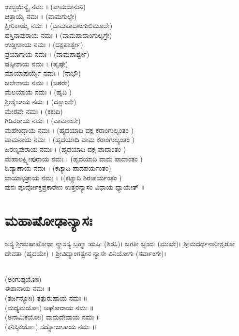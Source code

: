  ಉಜ್ಜಯಿನ್ಯೈ ನಮಃ । (ವಾಮಜಾನುನಿ)\\
 ಚಿತ್ರಾಯೈ ನಮಃ । (ವಾಮಗುಲ್ಫೇ)\\
 ಕ್ಷೀರಿಕಾಯೈ ನಮಃ । (ವಾಮಪಾದಾಂಗುಲಿಮೂಲೇ)\\
 ಹಸ್ತಿನಾಪುರಾಯ ನಮಃ । (ವಾಮಪಾದಾಂಗುಲ್ಯಗ್ರೇ)\\
 ಉಡ್ಡೀಶಾಯ ನಮಃ । (ದಕ್ಷಪಾರ್ಶ್ವೇ)\\
 ಪ್ರಯಾಗಾಯ ನಮಃ । (ವಾಮಪಾರ್ಶ್ವೇ)\\
 ಷಷ್ಠೀಶಾಯ ನಮಃ । (ಪೃಷ್ಠೇ)\\
 ಮಾಯಾಪುರ್ಯೈ ನಮಃ । (ನಾಭೌ)\\
 ಜಲೇಶಾಯ ನಮಃ । (ಜಠರೇ)\\
 ಮಲಯಾಯ ನಮಃ । (ಹೃದಿ )\\
 ಶ್ರೀಶೈಲಾಯ ನಮಃ । (ದಕ್ಷಾಂಸೇ)\\
 ಮೇರವೇ ನಮಃ । (ಕಕುದಿ)\\
 ಗಿರಿವರಾಯ ನಮಃ । (ವಾಮಾಂಸೇ)\\
 ಮಹೇಂದ್ರಾಯ ನಮಃ । (ಹೃದಯಾದಿ ದಕ್ಷ ಕರಾಂಗುಲ್ಯಂತಂ )\\
 ವಾಮನಾಯ ನಮಃ । (ಹೃದಯಾದಿ ವಾಮ ಕರಾಂಗುಲ್ಯಂತಂ )\\
 ಹಿರಣ್ಯಪುರಾಯ ನಮಃ । (ಹೃದಯಾದಿ ದಕ್ಷ ಪಾದಾಂತಂ )\\
 ಮಹಾಲಕ್ಷ್ಮೀಪುರಾಯ ನಮಃ । (ಹೃದಯಾದಿ ವಾಮ ಪಾದಾಂತಂ )\\
 ಓಡ್ಯಾಣಾಯ ನಮಃ । (ಕಟ್ಯಾದಿ ಪಾದಪರ್ಯಂತಂ)\\
 ಛಾಯಾಛತ್ರಾಯ ನಮಃ । ।(ಕಟ್ಯಾದಿ ಶಿರಃಪರ್ಯಂತಂ )\\
ಪುನಃ ಪೂರ್ವೋಕ್ತಪ್ರಕಾರೇಣ ಉತ್ತರನ್ಯಾಸಂ ವಿಧಾಯ ಧ್ಯಾಯೇತ್ ॥

\newpage
\section{ಮಹಾಷೋಢಾನ್ಯಾಸಃ}
ಅಸ್ಯ ಶ್ರೀಮಹಾಷೋಢಾ ನ್ಯಾಸಸ್ಯ ಬ್ರಹ್ಮಾ ಋಷಿಃ (ಶಿರಸಿ)। ಜಗತೀ ಚ್ಛಂದಃ (ಮುಖೇ)। ಶ್ರೀಮದರ್ಧನಾರೀಶ್ವರೋ ದೇವತಾ (ಹೃದಯೇ) । ಶ್ರೀವಿದ್ಯಾಂಗತ್ವೇನ ನ್ಯಾಸೇ ವಿನಿಯೋಗಃ (ಸರ್ವಾಂಗೇ)।

\\
(ಅಂಗುಷ್ಠಯೋಃ)\\ ಈಶಾನಾಯ ನಮಃ ॥\\
(ತರ್ಜನ್ಯೋಃ) ತತ್ಪುರುಷಾಯ ನಮಃ ॥\\
(ಮಧ್ಯಮಯೋಃ) ಅಘೋರಾಯ ನಮಃ ॥\\
(ಅನಾಮಿಕಯೋಃ) ವಾಮದೇವಾಯ ನಮಃ ॥\\
(ಕನಿಷ್ಠಿಕಯೋಃ) ಸದ್ಯೋಜಾತಾಯ ನಮಃ ॥

